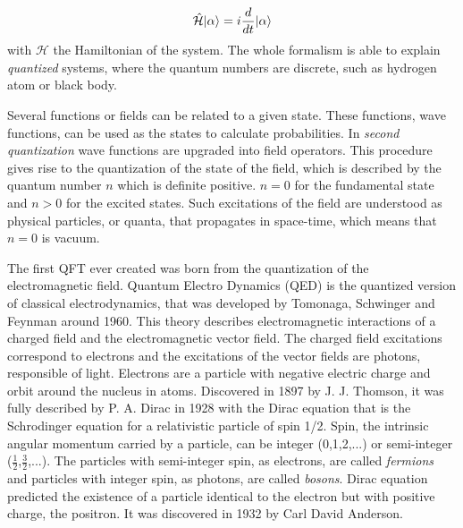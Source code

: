 \begin{equation}
  \label{eq:Schrodinger}
  \hat{\mathcal{H}}| \alpha\rangle=i\frac{d}{dt}| \alpha\rangle
\end{equation}with $\mathcal{H}$ the Hamiltonian of the system. The whole formalism is able to explain \textit{quantized} systems, where the quantum numbers are discrete, such as hydrogen atom or black body.

Several functions or fields can be related to a given state. These functions, wave functions, can be used as the states to calculate probabilities. In \textit{second quantization} wave functions are upgraded into field operators. This procedure gives rise to the quantization of the state of the field, which is described by the quantum number $n$ which is definite positive. $n=0$ for the fundamental state and $n>0$ for the excited states. Such excitations of the field are understood as physical particles, or quanta, that propagates in space-time, which means that $n=0$ is vacuum. 

The first QFT ever created was born from the quantization of the electromagnetic field. Quantum Electro Dynamics (QED) is the quantized version of classical electrodynamics, that was developed by Tomonaga, Schwinger and Feynman around 1960. This theory describes electromagnetic interactions of a charged field and the electromagnetic vector field. The charged field excitations correspond to electrons and the excitations of the vector fields are photons, responsible of light. Electrons are a particle with negative electric charge and orbit around the nucleus in atoms. Discovered in 1897 by J. J. Thomson, it was fully described by P. A. Dirac in 1928 with the Dirac equation that is the Schrodinger equation for a relativistic particle of spin 1/2. Spin, the intrinsic angular momentum carried by a particle, can be integer (0,1,2,...) or semi-integer ($\frac{1}{2}$,$\frac{3}{2}$,...). The particles with semi-integer spin, as electrons, are called \textit{fermions} and particles with integer spin, as photons, are called \textit{bosons}. Dirac equation predicted the existence of a particle identical to the electron but with positive charge, the positron. It was discovered in 1932 by Carl David Anderson.

